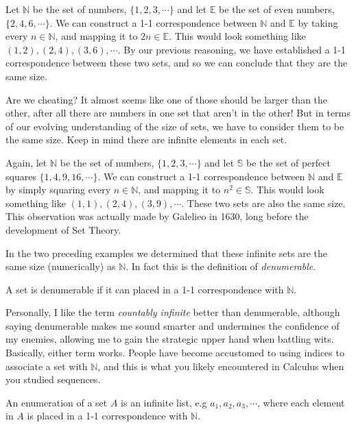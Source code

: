 \begin{example}
Let $\mathbb{N}$ be the set of  numbers, $\{1, 2, 3, \cdots\}$ and let $\mathbb{E}$ be the set of even numbers, $\{2, 4, 6, \cdots\}$.  We can construct a 1-1 correspondence between $\mathbb{N}$ and $\mathbb{E}$ by taking every $n\in \mathbb{N}$, and mapping it to $2n\in \mathbb{E}$.  This would look something like $ (1 , 2), (2 , 4), (3 , 6), \cdots$.  By our previous reasoning, we have established a 1-1 correspondence between these two sets, and so we can conclude that they are the same size.  
\end{example}
Are we cheating?  It almost seems like one of those should be larger than the other, after all there are numbers in one set that aren't in the other!  But in terms of our evolving understanding of the size of sets, we have to consider them to be the same size.  Keep in mind there are infinite elements in each set.  

\begin{example}
Again, let $\mathbb{N}$ be the set of  numbers, $\{1, 2, 3, \cdots\}$ and let $\mathbb{S}$ be the set of perfect squares $\{1, 4, 9, 16, \cdots\}$.  We can construct a 1-1 correspondence between $\mathbb{N}$ and $\mathbb{E}$ by simply squaring every $n\in \mathbb{N}$, and mapping it to $n^2\in \mathbb{S}$.  This would look something like $(1 , 1), (2 , 4), (3 , 9), \cdots$.  These two sets are also the same size.  This observation was actually made by Galelieo in 1630, long before the development of Set Theory.
\end{example}
In the two preceding examples we determined that these infinite sets are the same size (numerically) as $\mathbb{N}$.  In fact this is the definition of \emph{denumerable}.

\begin{definition}
A set is denumerable if it can placed in a 1-1 correspondence with $\mathbb{N}$.
\end{definition}
Personally, I like the term \emph{countably infinite} better than denumerable, although saying denumerable makes me sound smarter and undermines the confidence of my enemies, allowing me to gain the strategic upper hand when battling wits.  Basically, either term works.
People have become accustomed to using indices to associate a set with $\mathbb{N}$, and this is what you likely encountered in Calculus when you studied sequences.

\begin{definition}[Enumeration]
An enumeration of a set $A$ is an infinite list, e.g $a_1, a_2, a_3, \cdots$, where each element in $A$ is placed in a 1-1 correspondence with $\mathbb{N}$.
\end{definition}

